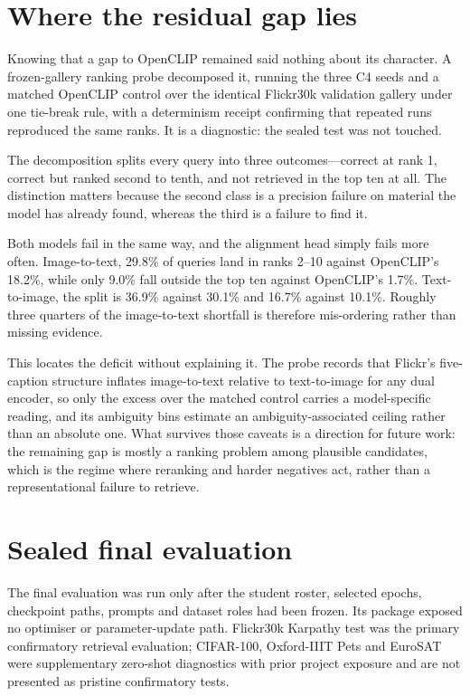 \documentclass[11pt,a4paper,oneside]{report}
\begin{document}
\section{Where the residual gap lies}
Knowing that a gap to OpenCLIP remained said nothing about its character. A frozen-gallery ranking probe decomposed it, running the three C4 seeds and a matched OpenCLIP control over the identical Flickr30k validation gallery under one tie-break rule, with a determinism receipt confirming that repeated runs reproduced the same ranks. It is a diagnostic: the sealed test was not touched.

The decomposition splits every query into three outcomes---correct at rank 1, correct but ranked second to tenth, and not retrieved in the top ten at all. The distinction matters because the second class is a precision failure on material the model has already found, whereas the third is a failure to find it.

Both models fail in the same way, and the alignment head simply fails more often. Image-to-text, 29.8\% of queries land in ranks 2--10 against OpenCLIP's 18.2\%, while only 9.0\% fall outside the top ten against OpenCLIP's 1.7\%. Text-to-image, the split is 36.9\% against 30.1\% and 16.7\% against 10.1\%. Roughly three quarters of the image-to-text shortfall is therefore mis-ordering rather than missing evidence.

This locates the deficit without explaining it. The probe records that Flickr's five-caption structure inflates image-to-text relative to text-to-image for any dual encoder, so only the excess over the matched control carries a model-specific reading, and its ambiguity bins estimate an ambiguity-associated ceiling rather than an absolute one. What survives those caveats is a direction for future work: the remaining gap is mostly a ranking problem among plausible candidates, which is the regime where reranking and harder negatives act, rather than a representational failure to retrieve.

\section{Sealed final evaluation}
The final evaluation was run only after the student roster, selected epochs, checkpoint paths, prompts and dataset roles had been frozen. Its package exposed no optimiser or parameter-update path. Flickr30k Karpathy test was the primary confirmatory retrieval evaluation; CIFAR-100, Oxford-IIIT Pets and EuroSAT were supplementary zero-shot diagnostics with prior project exposure and are not presented as pristine confirmatory tests.
\end{document}
